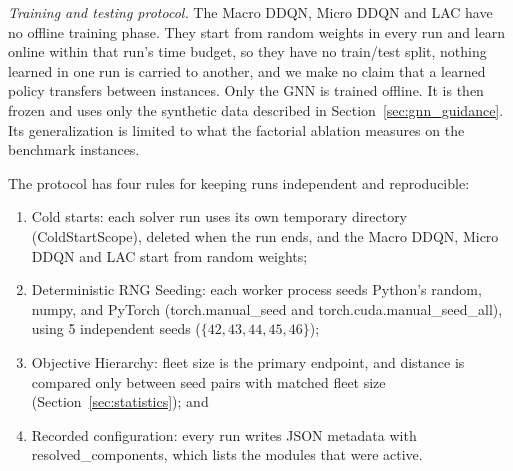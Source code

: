 \documentclass{ieeeaccess}
\begin{document}
\textit{Training and testing protocol.} The Macro DDQN, Micro DDQN and LAC have no offline training phase. They start from random weights in every run and learn online within that run's time budget, so they have no train/test split, nothing learned in one run is carried to another, and we make no claim that a learned policy transfers between instances. Only the GNN is trained offline. It is then frozen and uses only the synthetic data described in Section~\ref{sec:gnn_guidance}. Its generalization is limited to what the factorial ablation measures on the benchmark instances.

The protocol has four rules for keeping runs independent and reproducible:
\begin{enumerate}
    \item Cold starts: each solver run uses its own temporary directory (\textsf{\small ColdStartScope}), deleted when the run ends, and the Macro DDQN, Micro DDQN and LAC start from random weights;
    \item Deterministic RNG Seeding: each worker process seeds Python's \textsf{\small random}, \textsf{\small numpy}, and PyTorch (\textsf{\small torch.manual\_seed} and \textsf{\small torch.cuda.manual\_seed\_all}), using 5 independent seeds ($\{42, 43, 44, 45, 46\}$);
    \item Objective Hierarchy: fleet size is the primary endpoint, and distance is compared only between seed pairs with matched fleet size (Section~\ref{sec:statistics}); and
    \item Recorded configuration: every run writes JSON metadata with \textsf{\small resolved\_components}, which lists the modules that were active.
\end{enumerate} 
\end{document}
